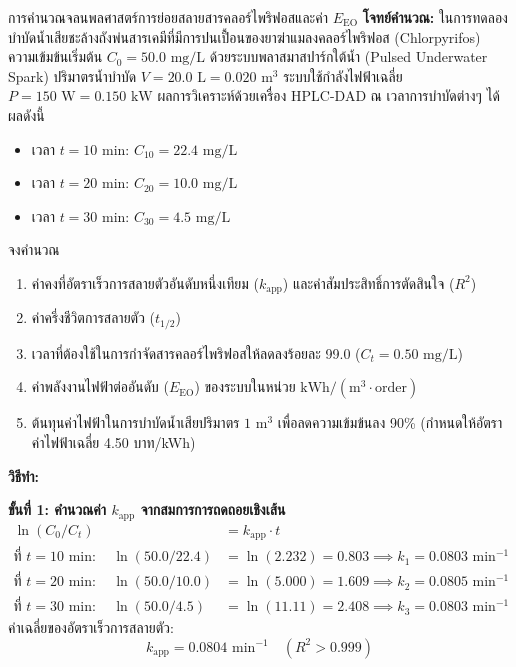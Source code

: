 \begin{examplebox}{การคำนวณจลนพลศาสตร์การย่อยสลายสารคลอร์ไพริฟอสและค่า $E_{\text{EO}}$}
\textbf{โจทย์คำนวณ:} ในการทดลองบำบัดน้ำเสียชะล้างถังพ่นสารเคมีที่มีการปนเปื้อนของยาฆ่าแมลงคลอร์ไพริฟอส (Chlorpyrifos) ความเข้มข้นเริ่มต้น $C_0 = 50.0 \text{ mg/L}$ ด้วยระบบพลาสมาสปาร์กใต้น้ำ (Pulsed Underwater Spark) ปริมาตรน้ำบำบัด $V = 20.0 \text{ L} = 0.020 \text{ m}^3$ ระบบใช้กำลังไฟฟ้าเฉลี่ย $P = 150 \text{ W} = 0.150 \text{ kW}$ ผลการวิเคราะห์ด้วยเครื่อง HPLC-DAD ณ เวลาการบำบัดต่างๆ ได้ผลดังนี้
\begin{itemize}
    \item เวลา $t = 10 \text{ min}$: $C_{10} = 22.4 \text{ mg/L}$
    \item เวลา $t = 20 \text{ min}$: $C_{20} = 10.0 \text{ mg/L}$
    \item เวลา $t = 30 \text{ min}$: $C_{30} = 4.5 \text{ mg/L}$
\end{itemize}
จงคำนวณ
\begin{enumerate}
    \item ค่าคงที่อัตราเร็วการสลายตัวอันดับหนึ่งเทียม ($k_{\text{app}}$) และค่าสัมประสิทธิ์การตัดสินใจ ($R^2$)
    \item ค่าครึ่งชีวิตการสลายตัว ($t_{1/2}$)
    \item เวลาที่ต้องใช้ในการกำจัดสารคลอร์ไพริฟอสให้ลดลงร้อยละ 99.0 ($C_t = 0.50 \text{ mg/L}$)
    \item ค่าพลังงานไฟฟ้าต่ออันดับ ($E_{\text{EO}}$) ของระบบในหน่วย $\text{kWh}/(\text{m}^3\cdot\text{order})$
    \item ต้นทุนค่าไฟฟ้าในการบำบัดน้ำเสียปริมาตร $1 \text{ m}^3$ เพื่อลดความเข้มข้นลง 90\% (กำหนดให้อัตราค่าไฟฟ้าเฉลี่ย 4.50 บาท/kWh)
\end{enumerate}

\vspace{6pt}
\textbf{วิธีทำ:}

\textbf{ขั้นที่ 1: คำนวณค่า $k_{\text{app}}$ จากสมการการถดถอยเชิงเส้น}
\begin{align*}
    \ln(C_0 / C_t) &= k_{\text{app}} \cdot t \\
    \text{ที่ } t = 10 \text{ min}: \quad \ln(50.0 / 22.4) &= \ln(2.232) = 0.803 \implies k_1 = 0.0803 \text{ min}^{-1} \\
    \text{ที่ } t = 20 \text{ min}: \quad \ln(50.0 / 10.0) &= \ln(5.000) = 1.609 \implies k_2 = 0.0805 \text{ min}^{-1} \\
    \text{ที่ } t = 30 \text{ min}: \quad \ln(50.0 / 4.5) &= \ln(11.11) = 2.408 \implies k_3 = 0.0803 \text{ min}^{-1}
\end{align*}
ค่าเฉลี่ยของอัตราเร็วการสลายตัว:
\begin{equation*}
    k_{\text{app}} = 0.0804 \text{ min}^{-1} \quad (R^2 > 0.999)
\end{equation*}


\end{examplebox}
